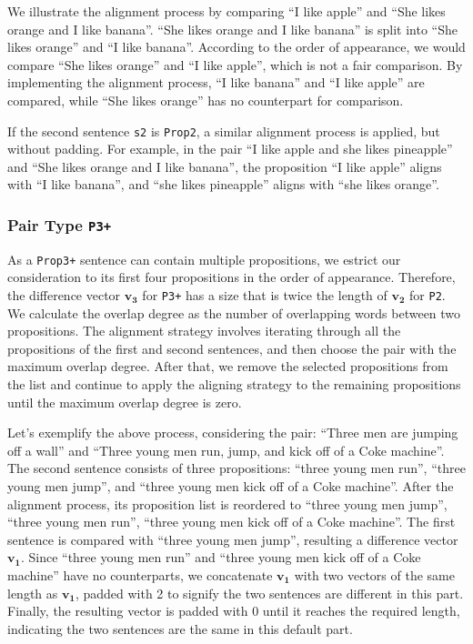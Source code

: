 We illustrate the alignment process by comparing ``I like apple'' and ``She likes orange and I like banana''. ``She likes orange and I like banana'' is split into ``She likes orange'' and ``I like banana''. According to the order of appearance, we would compare ``She likes orange'' and ``I like apple'', which is not a fair comparison. By implementing the alignment process, ``I like banana'' and ``I like apple'' are compared, while ``She likes orange'' has no counterpart for comparison.

If the second sentence \texttt{s2} is \texttt{Prop2}, a similar alignment process is applied, but without padding. For example, in the pair ``I like apple and she likes pineapple'' and ``She likes orange and I like banana'', the proposition ``I like apple'' aligns with ``I like banana'', and ``she likes pineapple'' aligns with ``she likes orange''.



\subsubsection{Pair Type \texttt{P3+}}
As a \texttt{Prop3+} sentence can contain multiple propositions, we estrict our consideration to its first four propositions in the order of appearance.
Therefore, the difference vector $\mathbf{v_3}$ for \texttt{P3+} has a size that is twice the length of $\mathbf{v_2}$ for \texttt{P2}. We calculate the overlap degree as the number of overlapping words between two propositions. The alignment strategy involves iterating through all the propositions of the first and second sentences, and then choose the pair with the maximum overlap degree. After that, we remove the selected propositions from the list and continue to apply the aligning strategy to the remaining propositions until the maximum overlap degree is zero.

Let's exemplify the above process, considering the pair: ``Three men are jumping off a wall'' and ``Three young men run, jump, and kick off of a Coke machine''. The second sentence consists of three propositions: ``three young men run'', ``three young men jump'', and ``three young men kick off of a Coke machine''. After the alignment process, its proposition list is reordered to ``three young men jump'', ``three young men run'', ``three young men kick off of a Coke machine''. The first sentence is compared with ``three young men jump'', resulting a difference vector $\mathbf{v_1}$. Since ``three young men run'' and ``three young men kick off of a Coke machine''
have no counterparts, we concatenate $\mathbf{v_1}$ with two vectors of the same length as $\mathbf{v_1}$, padded with 2 to signify the two sentences are different in this part. Finally, the resulting vector is padded with 0 until it reaches the required length, indicating the two sentences are the same in this default part.
